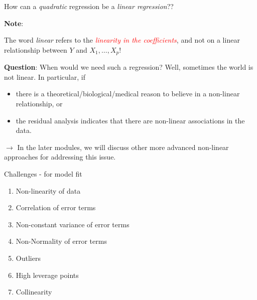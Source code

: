 \documentclass[
  10pt,
  ignorenonframetext,
]{beamer}
\providecommand{\tightlist}{%
  \setlength{\itemsep}{0pt}\setlength{\parskip}{0pt}}
\begin{document}
\begin{frame}
How can a \emph{quadratic} regression be a \emph{linear regression}??

\vspace{4mm}

\textbf{Note}:

The word \emph{linear} refers to the
\emph{\textcolor{red}{linearity in the coefficients}}, and not on a
linear relationship between \(Y\) and \(X_1, \ldots , X_p\)!

\vspace{4mm}

\textbf{Question}: When would we need such a regression? Well, sometimes
the world is not linear. In particular, if

\begin{itemize}
\tightlist
\item
  there is a theoretical/biological/medical reason to believe in a
  non-linear relationship, or
\item
  the residual analysis indicates that there are non-linear associations
  in the data.
\end{itemize}

\vspace{4mm}

\scriptsize

\(\rightarrow\) In the later modules, we will discuss other more
advanced non-linear approaches for addressing this issue.
\end{frame}

\begin{frame}{Challenges - for model fit}
\protect\hypertarget{challenges---for-model-fit}{}
\(~\)

\begin{enumerate}
\tightlist
\item
  Non-linearity of data
\item
  Correlation of error terms
\item
  Non-constant variance of error terms
\item
  Non-Normality of error terms
\item
  Outliers
\item
  High leverage points
\item
  Collinearity
\end{enumerate}
\end{frame}
\end{document}
